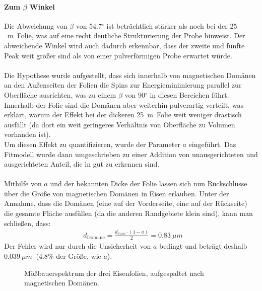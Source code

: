 \documentclass[german,  %
parskip=full,  %
headsepline]{scrartcl}
\newcommand{\mum}{\:\si{\mu m\:}}
\newcommand{\bcref}[1]{\namecref{#1} \textcolor{blue}{\labelcref{#1}}}
\begin{document}
\paragraph{Zum $\beta$ Winkel}Die Abweichung von $\beta$ von 54.7$^\circ$ ist beträchtlich stärker als noch bei der 25 \mum Folie, was auf eine recht deutliche Strukturierung der Probe hinweist. Der abweichende Winkel wird auch dadurch erkennbar, dass der zweite und fünfte Peak weit größer sind als von einer pulverförmigen Probe erwartet würde. \\\\Die Hypothese wurde aufgestellt, dass sich innerhalb von magnetischen Domänen an den Außenseiten der Folien die Spins zur Energieminimierung parallel zur Oberfläche ausrichten, was zu einem $\beta$ von 90$^\circ$ in diesen Bereichen führt. Innerhalb der Folie sind die Domänen aber weiterhin pulverartig verteilt, was erklärt, warum der Effekt bei der dickeren 25\mum Folie weit weniger drastisch ausfällt (da dort ein weit geringeres Verhältnis von Oberfläche zu Volumen vorhanden ist). \\Um diesen Effekt zu quantifizieren, wurde der Parameter $a$ eingeführt. Das Fitmodell wurde dann umgeschrieben zu einer Addition von unausgerichteten und ausgerichteten Anteil, die in \bcref{fig:4x3} gut zu erkennen sind. \\\\
Mithilfe von $a$ und der bekannten Dicke der Folie lassen sich nun Rückschlüsse über die Größe von magnetischen Domänen in Eisen erlauben. Unter der Annahme, dass die Domänen (eine auf der Vorderseite, eine auf der Rückseite) die gesamte Fläche ausfüllen (da die anderen Randgebiete klein sind), kann man schließen, dass:
\begin{align}
    &d_\text{Domäne}=\frac{d_\mathrm{Folie}\cdot(1-a)}{2}=0.83\mum
\end{align}
Der Fehler wird nur durch die Unsicherheit von $a$ bedingt und beträgt deshalb $0.039\mum$ (4.8\% der Größe, wie $a$).
\begin{figure}[!htp]
    \centering
    
    \caption{Mößbauerspektrum der drei Eisenfolien, aufgespaltet nach magnetischen Domänen.}
    \label{fig:4x3}
\end{figure}
\end{document}
